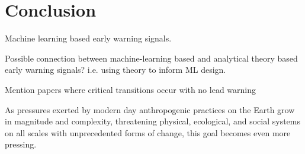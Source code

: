 \section{Conclusion}
\label{sec:conclusion}


Machine learning based early warning signals. 

Possible connection between machine-learning based and analytical theory based early warning signals? i.e. using theory to inform ML design. 


Mention papers where critical transitions occur with no lead warning



As pressures exerted by modern day anthropogenic practices on the Earth grow in magnitude and complexity, threatening physical, ecological, and social systems on all scales with unprecedented forms of change, this goal becomes even more pressing. 